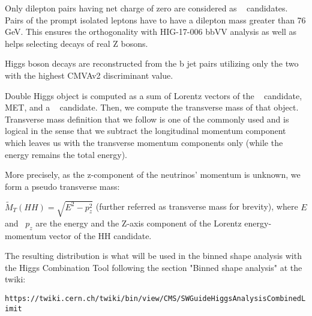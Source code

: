 Only dilepton pairs having net charge of zero are considered as \ZtoLL~ candidates. Pairs of the prompt isolated leptons have to have a dilepton mass greater than 76 GeV. This ensures the orthogonality with HIG-17-006 bbVV analysis as well as helps selecting decays of real Z bosons.

Higgs boson decays are reconstructed from the b jet pairs utilizing only the two with the highest CMVAv2 discriminant value. 

Double Higgs object is computed as a sum of Lorentz vectors of the \ZtoLL~ candidate, MET, and a \HBB~ candidate. Then, we compute the transverse mass of that object. Transverse mass definition that we follow is one of the commonly used and is logical in the sense that we subtract the longitudinal momentum component which leaves us with the transverse momentum components only (while the energy remains the total energy).

More precisely, as the z-component of the neutrinos' momentum is unknown, we form a pseudo transverse mass:


$\tilde{M}_T(HH) = \sqrt{E^2 - p_{z}^2}$ (further referred as transverse mass for brevity), where $E$ and \
$p_z$ are the energy and the Z-axis component of the Lorentz energy-momentum vector of the HH candidate.

The resulting distribution is what will be used in the binned shape analysis with the Higgs Combination Tool following the section "Binned shape analysis" at the twiki:
\begin{center}
    \small{\texttt{https://twiki.cern.ch/twiki/bin/view/CMS/SWGuideHiggsAnalysisCombinedLimit}}
\end{center}
